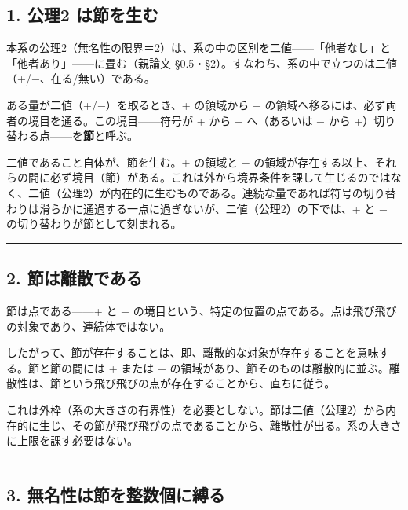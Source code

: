 \documentclass[11pt]{ltjsarticle}
\begin{document}
\subsection{1. 公理2
は節を生む}\label{ux516cux74062-ux306fux7bc0ux3092ux751fux3080}

本系の公理2（無名性の限界＝2）は、系の中の区別を二値------「他者なし」と「他者あり」------に畳む（親論文
§0.5・§2）。すなわち、系の中で立つのは二値（+/−、在る/無い）である。

ある量が二値（+/−）を取るとき、+ の領域から −
の領域へ移るには、必ず両者の境目を通る。この境目------符号が + から −
へ（あるいは − から +）切り替わる点------を\textbf{節}と呼ぶ。

二値であること自体が、節を生む。+ の領域と −
の領域が存在する以上、それらの間に必ず境目（節）がある。これは外から境界条件を課して生じるのではなく、二値（公理2）が内在的に生むものである。連続な量であれば符号の切り替わりは滑らかに通過する一点に過ぎないが、二値（公理2）の下では、+
と − の切り替わりが節として刻まれる。

\begin{center}\rule{0.5\linewidth}{0.5pt}\end{center}

\subsection{2.
節は離散である}\label{ux7bc0ux306fux96e2ux6563ux3067ux3042ux308b}

節は点である------+ と −
の境目という、特定の位置の点である。点は飛び飛びの対象であり、連続体ではない。

したがって、節が存在することは、即、離散的な対象が存在することを意味する。節と節の間には
+ または −
の領域があり、節そのものは離散的に並ぶ。離散性は、節という飛び飛びの点が存在することから、直ちに従う。

これは外枠（系の大きさの有界性）を必要としない。節は二値（公理2）から内在的に生じ、その節が飛び飛びの点であることから、離散性が出る。系の大きさに上限を課す必要はない。

\begin{center}\rule{0.5\linewidth}{0.5pt}\end{center}

\subsection{3.
無名性は節を整数個に縛る}\label{ux7121ux540dux6027ux306fux7bc0ux3092ux6574ux6570ux500bux306bux7e1bux308b}
\end{document}
